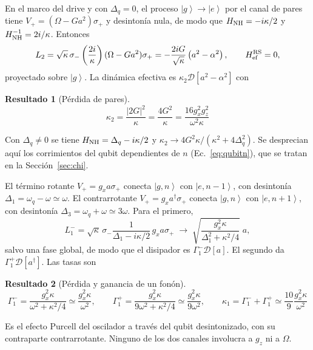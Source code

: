 \documentclass[11pt,a4paper]{article}
\newcommand{\ket}[1]{\left|#1\right\rangle}
\newcommand{\spl}{\sigma_{+}}
\newcommand{\smi}{\sigma_{-}}
\newcommand{\D}{\mathcal{D}}
\newcommand{\Href}{H_{\mathrm{ef}}}
\theoremstyle{definition}
\newtheorem{resultado}{Resultado}
\begin{document}
En el marco del drive y con $\Delta_q=0$, el proceso $\ket{g}\to\ket{e}$ por el canal de pares tiene $V_+=(\Omega-Ga^2)\spl$ y desintonía nula, de modo que $H_{\rm NH}=-i\kappa/2$ y $H_{\rm NH}^{-1}=2i/\kappa$. Entonces
\begin{equation}
L_2=\sqrt\kappa\,\smi\left(\frac{2i}{\kappa}\right)(\Omega-Ga^2)\spl=-\frac{2iG}{\sqrt\kappa}\left(a^2-\alpha^2\right),\qquad \Href^{\rm RS}=0,
\end{equation}
proyectado sobre $\ket{g}$. La dinámica efectiva es $\kappa_2\D[a^2-\alpha^2]$ con
\begin{resultado}[Pérdida de pares]
\begin{equation}
\boxed{\kappa_2=\frac{|2G|^2}{\kappa}=\frac{4G^2}{\kappa}=\frac{16g_x^2g_z^2}{\omega^2\kappa}}
\label{eq:k2}
\end{equation}
\end{resultado}
Con $\Delta_q\neq0$ se tiene $H_{\rm NH}=\Delta_q-i\kappa/2$ y $\kappa_2\to4G^2\kappa/(\kappa^2+4\Delta_q^2)$. Se desprecian aquí los corrimientos del qubit dependientes de $n$ (Ec.~\eqref{eq:qubitn}), que se tratan en la Sección~\ref{sec:chi}.


El término rotante $V_+=g_xa\spl$ conecta $\ket{g,n}$ con $\ket{e,n-1}$, con desintonía $\Delta_1=\omega_q-\omega\simeq\omega$. El contrarrotante $V_+=g_xa^{\dagger}\spl$ conecta $\ket{g,n}$ con $\ket{e,n+1}$, con desintonía $\Delta_3=\omega_q+\omega\simeq3\omega$. Para el primero,
\begin{equation}
L_1^{-}=\sqrt\kappa\,\smi\frac{1}{\Delta_1-i\kappa/2}\,g_xa\spl\;\to\;\sqrt{\frac{g_x^2\kappa}{\Delta_1^2+\kappa^2/4}}\;a,
\end{equation}
salvo una fase global, de modo que el disipador es $\Gamma_1^{-}\D[a]$. El segundo da $\Gamma_1^{+}\D[a^{\dagger}]$. Las tasas son
\begin{resultado}[Pérdida y ganancia de un fonón]
\begin{equation}
\boxed{\Gamma_1^{-}=\frac{g_x^2\kappa}{\omega^2+\kappa^2/4}\simeq\frac{g_x^2\kappa}{\omega^2},\qquad \Gamma_1^{+}=\frac{g_x^2\kappa}{9\omega^2+\kappa^2/4}\simeq\frac{g_x^2\kappa}{9\omega^2},\qquad \kappa_1=\Gamma_1^{-}+\Gamma_1^{+}\simeq\frac{10}{9}\frac{g_x^2\kappa}{\omega^2}}
\label{eq:k1}
\end{equation}
\end{resultado}
Es el efecto Purcell del oscilador a través del qubit desintonizado, con su contraparte contrarrotante. Ninguno de los dos canales involucra a $g_z$ ni a $\Omega$.
\end{document}
